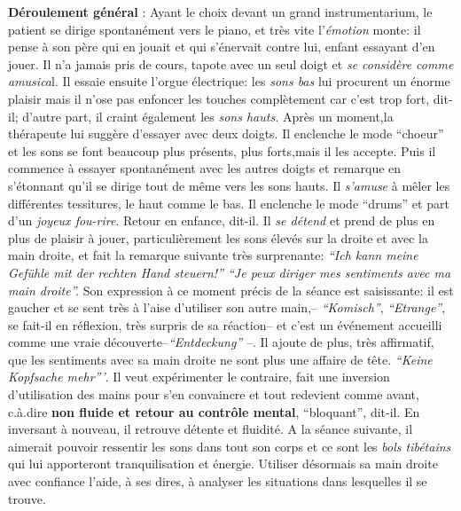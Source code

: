  	 \textbf{Déroulement général} : 
Ayant le choix devant un grand instrumentarium,
        le patient se dirige spontanément vers le piano, et très vite
        l'\textit{émotion} monte: il pense à son père qui en jouait et qui
        s'énervait contre lui, enfant essayant d'en
        jouer. Il n'a jamais pris de cours, tapote avec un seul doigt et \textit{se considère comme
        amusica}l. Il essaie ensuite l'orgue électrique: les \textit{sons bas}
        lui procurent un énorme plaisir mais il n'ose pas enfoncer les touches
        complètement car c'est trop fort, dit-il; d'autre part, il
        craint également les
        \textit{sons hauts.}
        Après un moment,la thérapeute lui suggère d'essayer avec deux doigts.
        Il enclenche le mode ``choeur'' et les sons se font beaucoup
        plus présents, plus forts,mais il les accepte. Puis il commence à essayer spontanément
        avec les autres doigts et remarque en s'étonnant qu'il se
        dirige tout de même vers les sons
        hauts. Il \textit{s'amuse} à mêler les différentes tessitures,
        le haut comme le bas.
        Il enclenche le mode ``drums'' et part d'un\textit{ joyeux
        fou-rire}. Retour en enfance, dit-il.
        Il \textit{se détend} et prend de plus en plus de plaisir à jouer, particulièrement  les sons élevés
        sur la droite et avec la main droite, et fait
        la remarque suivante très surprenante:
        \textit{``Ich kann meine Gefühle mit der rechten Hand steuern!''
        ``Je peux diriger mes sentiments avec ma main droite''.}
 Son expression à ce moment précis de la séance est saisissante: il
        est gaucher et se sent très à l'aise d'utiliser son autre
        main,-- \textit{``Komisch''},  \textit{``Etrange''}, se fait-il
        en réflexion, très surpris de sa réaction-- et c'est un événement
        accueilli comme une vraie
        découverte--\textit{``Entdeckung''} --.
        Il ajoute de plus, très affirmatif, que les sentiments avec sa main
        droite ne sont plus une affaire de tête. \textit{``Keine
        Kopfsache mehr'''}. Il veut expérimenter le contraire, fait
      une inversion d'utilisation des mains pour s'en convaincre et tout redevient comme
        avant, c.à.dire \textbf{non fluide et retour au contrôle
          mental}, 
        ``bloquant'', dit-il. En inversant à nouveau, il retrouve 
        détente et fluidité.
        A la séance suivante, il aimerait pouvoir ressentir 
        les sons dans tout son corps et ce sont les\textit{ bols
          tibétains } qui lui
        apporteront tranquilisation et
        énergie. Utiliser désormais sa main
        droite avec confiance l'aide, à ses dires, à analyser les
        situations dans lesquelles il se trouve.

